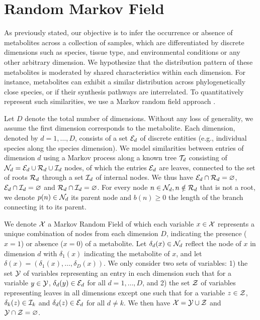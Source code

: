 \documentclass[
11pt, %
oneside, %
english, %
singlespacing, %
headsepline, %
chapterinoneline, %
]{MastersDoctoralThesis} %
\def\E{\mathbb{E}}
\def\E{{\cal E}}
\def\I{{\cal I}}
\def\N{{\cal N}}
\def\R{{\cal R}}
\def\T{{\cal T}}
\def\X{{\cal X}}
\def\Y{{\cal Y}}
\def\Z{{\cal Z}}
\begin{document}
\section{Random Markov Field}\label{sec:methods:random markov field}

As previously stated, our objective is to infer the occurrence or absence of metabolites across a collection of samples, which are differentiated by discrete dimensions such as species, tissue type, and environmental conditions or any other arbitrary dimension. We hypothesize that the distribution pattern of these metabolites is moderated by shared characteristics within each dimension. For instance, metabolites can exhibit a similar distribution across phylogenetically close species, or if their synthesis pathways are interrelated. To quantitatively represent such similarities, we use a Markov random field approach \cite{sherringtonSolvableModelSpinGlass1975, kindermannMarkovRandomFields1980}.

Let $D$ denote the total number of dimensions. Without any loss of generality, we assume the first dimension corresponds to the metabolite. Each dimension, denoted by $d=1, \ldots, D$, consists of a set $\E_d$ of discrete entities (e.g., individual species along the species dimension). We model similarities between entries of dimension $d$ using a Markov process along a known tree $\T_d$ consisting of $\N_d = \E_d \cup \R_d \cup \I_d$ nodes, of which the entries $\E_d$ are leaves, connected to the set of roots $\R_d$ through a set $\I_d$ of internal nodes. We thus have $\E_d \cap \R_d = \varnothing$, $\E_d \cap \I_d = \varnothing$ and $\R_d \cap \I_d = \varnothing$. For every node $n \in \N_d, n \notin \R_d$ that is not a root, we denote $p(n) \in \N_d$ its parent node and $b(n) \geq 0$ the length of the branch connecting it to its parent.

We denote $\X$ a Markov Random Field of which each variable $x \in \X$ represents a unique combination of nodes from each dimension $D$, indicating the presence ($x=1$) or absence ($x=0$) of a metabolite. Let $\delta_d(x) \in \N_d$ reflect the node of $x$ in dimension $d$ with $\delta_1(x)$ indicating the metabolite of $x$, and let $\delta(x)=(\delta_1(x), \ldots, \delta_D(x))$. We only consider two sets of variables: 1) the set $\Y$ of variables representing an entry in each dimension such that for a variable $y\in\Y$, $\delta_d(y) \in \E_d$ for all $d=1, \ldots, D$, and 2) the set $\Z$ of variables representing leaves in all dimensions except one such that for a variable $z \in \Z$, $\delta_k(z) \in \I_k$ and $\delta_d(z) \in \E_d$ for all $d \neq k$. We then have $\X = \Y \cup \Z$ and $\Y \cap \Z = \varnothing$.
\end{document}
